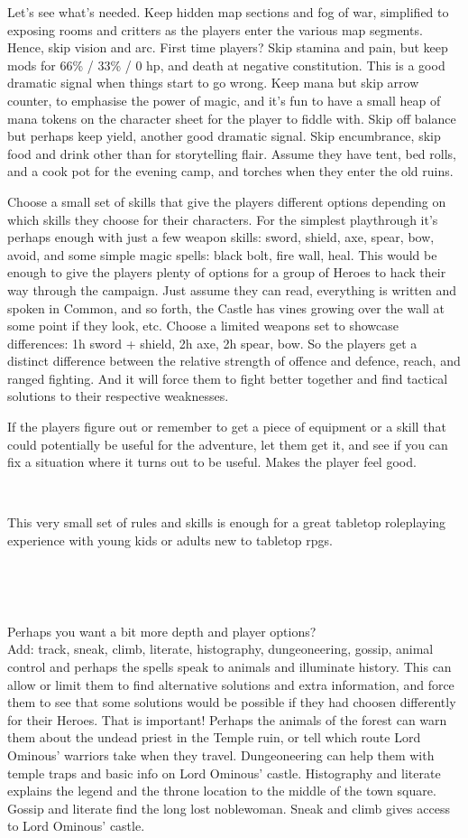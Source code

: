 Let's see what's needed. Keep hidden map sections and fog of war, simplified to exposing rooms and critters as the players enter the various map segments. Hence, skip vision and arc. First time players? Skip stamina and pain, but keep mods for 66\% / 33\% / 0 hp, and death at negative constitution. This is a good dramatic signal when things start to go wrong. Keep mana but skip arrow counter, to emphasise the power of magic, and it's fun to have a small heap of mana tokens on the character sheet for the player to fiddle with. Skip off balance but perhaps keep yield, another good dramatic signal. Skip encumbrance, skip food and drink other than for storytelling flair. Assume they have tent, bed rolls, and a cook pot for the evening camp, and torches when they enter the old ruins.

Choose a small set of skills that give the players different options depending on which skills they choose for their characters. For the simplest playthrough it's perhaps enough with just a few weapon skills: sword, shield, axe, spear, bow, avoid, and some simple magic spells: black bolt, fire wall, heal. This would be enough to give the players plenty of options for a group of Heroes to hack their way through the campaign. Just assume they can read, everything is written and spoken in Common, and so forth, the Castle has vines growing over the wall at some point if they look, etc. Choose a limited weapons set to showcase differences: 1h sword + shield, 2h axe, 2h spear, bow. So the players get a distinct difference between the relative strength of offence and defence, reach, and ranged fighting. And it will force them to fight better together and find tactical solutions to their respective weaknesses.

If the players figure out or remember to get a piece of equipment or a skill that could potentially be useful for the adventure, let them get it, and see if you can fix a situation where it turns out to be useful. Makes the player feel good.

\

\noindent This very small set of rules and skills is enough for a great tabletop roleplaying experience with young kids or adults new to tabletop rpgs.

\

\

Perhaps you want a bit more depth and player options? \\
Add: track, sneak, climb, literate, histography, dungeoneering, gossip, animal control and perhaps the spells speak to animals and illuminate history. This can allow or limit them to find alternative solutions and extra information, and force them to see that some solutions would be possible if they had choosen differently for their Heroes. That is important! Perhaps the animals of the forest can warn them about the undead priest in the Temple ruin, or tell which route Lord Ominous' warriors take when they travel. Dungeoneering can help them with temple traps and basic info on Lord Ominous' castle. Histography and literate explains the legend and the throne location to the middle of the town square. Gossip and literate find the long lost noblewoman. Sneak and climb gives access to Lord Ominous' castle.

